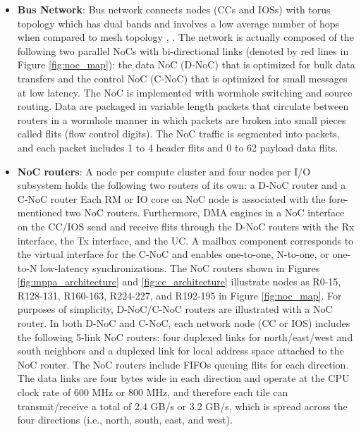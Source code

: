 \documentclass{sig-alternate-05-2015}
\begin{document}
\begin{itemize}
\item \textbf{Bus Network}:
Bus network connects nodes (CCs and IOSs) with torus topology \cite{dally2001route}
which has dual bands and involves a low average number of hops when compared to mesh topology \cite{vangal200780}, \cite{taylor2002raw}.
The network is actually composed of the following two parallel NoCs with bi-directional links (denoted by red lines in Figure \ref{fig:noc_map}):
the data NoC (D-NoC) that is optimized for bulk data transfers and the control NoC (C-NoC) that is optimized for small messages at low latency.
The NoC is implemented with wormhole switching and source routing.
Data are packaged in variable length packets that circulate between routers in a wormhole manner in which packets are broken into small pieces called flits (flow control digits).
The NoC traffic is segmented into packets, and each packet includes 1 to 4 header flits and 0 to 62 payload data flits.

\item \textbf{NoC routers}:
A node per compute cluster and four nodes per I/O subsystem holds the following two routers of its
own: a D-NoC router and a C-NoC router
Each RM or IO core on NoC node is associated with the fore-mentioned two NoC routers.
Furthermore, DMA engines in a NoC interface on the CC/IOS send and receive flits through the D-NoC routers with the Rx interface, the Tx interface, and the UC.
A mailbox component corresponds to the virtual interface for the C-NoC and enables one-to-one, N-to-one, or one-to-N low-latency synchronizations.
The NoC routers shown in Figures \ref{fig:mppa_architecture} and \ref{fig:cc_architecture} illustrate nodes as R0-15, R128-131, R160-163, R224-227, and R192-195 in Figure \ref{fig:noc_map}.
For purposes of simplicity, D-NoC/C-NoC routers are illustrated with a NoC router.
In both D-NoC and C-NoC, each network node (CC or IOS)  includes the following 5-link NoC routers:
four duplexed links for north/east/west and south neighbors and a duplexed link for local address space attached to the NoC router.
The NoC routers include FIFOs queuing flits for each direction.
The data links are four bytes wide in each direction and operate at the CPU clock rate of 600 MHz or 800 MHz, and therefore each tile can transmit/receive a total of 2.4 GB/s or 3.2 GB/s, which is spread across the four directions (i.e., north, south, east, and west).
\end{itemize}
\end{document}
